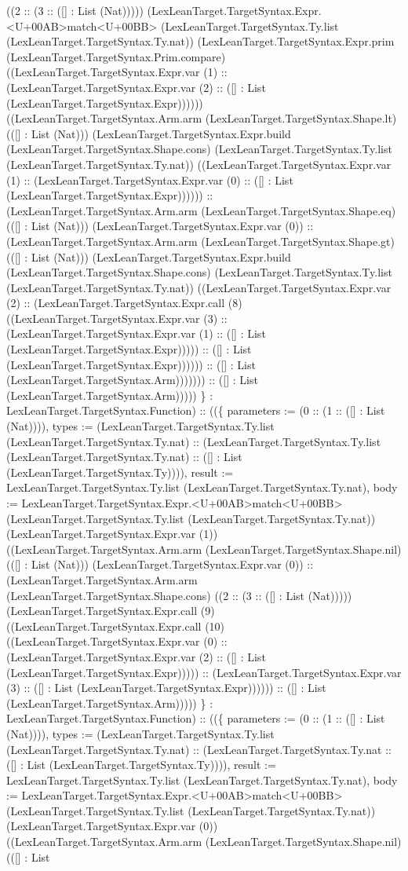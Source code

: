 \documentclass[11pt]{article}
\begin{document}
((2 :: (3 :: ([] : List (Nat))))) (LexLeanTarget.TargetSyntax.Expr.<U+00AB>match<U+00BB> (LexLeanTarget.TargetSyntax.Ty.list (LexLeanTarget.TargetSyntax.Ty.nat)) (LexLeanTarget.TargetSyntax.Expr.prim (LexLeanTarget.TargetSyntax.Prim.compare) ((LexLeanTarget.TargetSyntax.Expr.var (1) :: (LexLeanTarget.TargetSyntax.Expr.var (2) :: ([] : List (LexLeanTarget.TargetSyntax.Expr)))))) ((LexLeanTarget.TargetSyntax.Arm.arm (LexLeanTarget.TargetSyntax.Shape.lt) (([] : List (Nat))) (LexLeanTarget.TargetSyntax.Expr.build (LexLeanTarget.TargetSyntax.Shape.cons) (LexLeanTarget.TargetSyntax.Ty.list (LexLeanTarget.TargetSyntax.Ty.nat)) ((LexLeanTarget.TargetSyntax.Expr.var (1) :: (LexLeanTarget.TargetSyntax.Expr.var (0) :: ([] : List (LexLeanTarget.TargetSyntax.Expr)))))) :: (LexLeanTarget.TargetSyntax.Arm.arm (LexLeanTarget.TargetSyntax.Shape.eq) (([] : List (Nat))) (LexLeanTarget.TargetSyntax.Expr.var (0)) :: (LexLeanTarget.TargetSyntax.Arm.arm (LexLeanTarget.TargetSyntax.Shape.gt) (([] : List (Nat))) (LexLeanTarget.TargetSyntax.Expr.build (LexLeanTarget.TargetSyntax.Shape.cons) (LexLeanTarget.TargetSyntax.Ty.list (LexLeanTarget.TargetSyntax.Ty.nat)) ((LexLeanTarget.TargetSyntax.Expr.var (2) :: (LexLeanTarget.TargetSyntax.Expr.call (8) ((LexLeanTarget.TargetSyntax.Expr.var (3) :: (LexLeanTarget.TargetSyntax.Expr.var (1) :: ([] : List (LexLeanTarget.TargetSyntax.Expr))))) :: ([] : List (LexLeanTarget.TargetSyntax.Expr)))))) :: ([] : List (LexLeanTarget.TargetSyntax.Arm))))))) :: ([] : List (LexLeanTarget.TargetSyntax.Arm))))) \} : LexLeanTarget.TargetSyntax.Function) :: ((\{ parameters := (0 :: (1 :: ([] : List (Nat)))), types := (LexLeanTarget.TargetSyntax.Ty.list (LexLeanTarget.TargetSyntax.Ty.nat) :: (LexLeanTarget.TargetSyntax.Ty.list (LexLeanTarget.TargetSyntax.Ty.nat) :: ([] : List (LexLeanTarget.TargetSyntax.Ty)))), result := LexLeanTarget.TargetSyntax.Ty.list (LexLeanTarget.TargetSyntax.Ty.nat), body := LexLeanTarget.TargetSyntax.Expr.<U+00AB>match<U+00BB> (LexLeanTarget.TargetSyntax.Ty.list (LexLeanTarget.TargetSyntax.Ty.nat)) (LexLeanTarget.TargetSyntax.Expr.var (1)) ((LexLeanTarget.TargetSyntax.Arm.arm (LexLeanTarget.TargetSyntax.Shape.nil) (([] : List (Nat))) (LexLeanTarget.TargetSyntax.Expr.var (0)) :: (LexLeanTarget.TargetSyntax.Arm.arm (LexLeanTarget.TargetSyntax.Shape.cons) ((2 :: (3 :: ([] : List (Nat))))) (LexLeanTarget.TargetSyntax.Expr.call (9) ((LexLeanTarget.TargetSyntax.Expr.call (10) ((LexLeanTarget.TargetSyntax.Expr.var (0) :: (LexLeanTarget.TargetSyntax.Expr.var (2) :: ([] : List (LexLeanTarget.TargetSyntax.Expr))))) :: (LexLeanTarget.TargetSyntax.Expr.var (3) :: ([] : List (LexLeanTarget.TargetSyntax.Expr)))))) :: ([] : List (LexLeanTarget.TargetSyntax.Arm))))) \} : LexLeanTarget.TargetSyntax.Function) :: ((\{ parameters := (0 :: (1 :: ([] : List (Nat)))), types := (LexLeanTarget.TargetSyntax.Ty.list (LexLeanTarget.TargetSyntax.Ty.nat) :: (LexLeanTarget.TargetSyntax.Ty.nat :: ([] : List (LexLeanTarget.TargetSyntax.Ty)))), result := LexLeanTarget.TargetSyntax.Ty.list (LexLeanTarget.TargetSyntax.Ty.nat), body := LexLeanTarget.TargetSyntax.Expr.<U+00AB>match<U+00BB> (LexLeanTarget.TargetSyntax.Ty.list (LexLeanTarget.TargetSyntax.Ty.nat)) (LexLeanTarget.TargetSyntax.Expr.var (0)) ((LexLeanTarget.TargetSyntax.Arm.arm (LexLeanTarget.TargetSyntax.Shape.nil) (([] : List 
\end{document}

